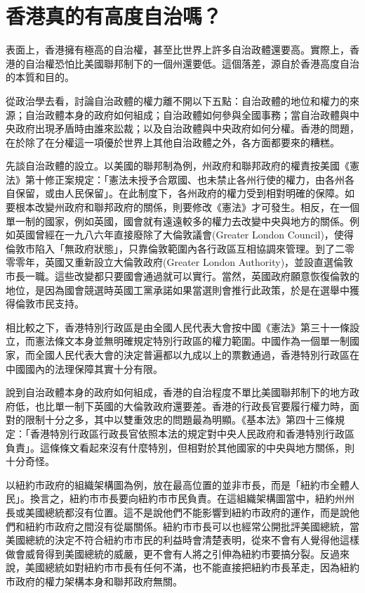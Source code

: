 \section{香港真的有高度自治嗎？}

表面上，香港擁有極高的自治權，甚至比世界上許多自治政體還要高。實際上，香港的自治權恐怕比美國聯邦制下的一個州還要低。這個落差，源自於香港高度自治的本質和目的。

從政治學去看，討論自治政體的權力離不開以下五點：自治政體的地位和權力的來源；自治政體本身的政府如何組成；自治政體如何參與全國事務；當自治政體與中央政府出現矛盾時由誰來訟裁；以及自治政體與中央政府如何分權。香港的問題，在於除了在分權這一項優於世界上其他自治政體之外，各方面都要來的糟糕。

先談自治政體的設立。以美國的聯邦制為例，州政府和聯邦政府的權責按美國《憲法》第十修正案規定：「憲法未授予合眾國、也未禁止各州行使的權力，由各州各自保留，或由人民保留」。在此制度下，各州政府的權力受到相對明確的保障。如要根本改變州政府和聯邦政府的關係，則要修改《憲法》才可發生。相反，在一個單一制的國家，例如英國，國會就有遠遠較多的權力去改變中央與地方的關係。例如英國曾經在一九八六年直接廢除了大倫敦議會(Greater London Council)，使得倫敦市陷入「無政府狀態」，只靠倫敦範圍內各行政區互相協調來管理。到了二零零零年，英國又重新設立大倫敦政府(Greater London Authority)，並設直選倫敦市長一職。這些改變都只要國會通過就可以實行。當然，英國政府願意恢復倫敦的地位，是因為國會競選時英國工黨承諾如果當選則會推行此政策，於是在選舉中獲得倫敦市民支持。

相比較之下，香港特別行政區是由全國人民代表大會按中國《憲法》第三十一條設立，而憲法條文本身並無明確規定特別行政區的權力範圍。中國作為一個單一制國家，而全國人民代表大會的決定普遍都以九成以上的票數通過，香港特別行政區在中國國內的法理保障其實十分有限。

說到自治政體本身的政府如何組成，香港的自治程度不單比美國聯邦制下的地方政府低，也比單一制下英國的大倫敦政府還要差。香港的行政長官要履行權力時，面對的限制十分之多，其中以雙重效忠的問題最為明顯。《基本法》第四十三條規定：「香港特別行政區行政長官依照本法的規定對中央人民政府和香港特別行政區負責」。這條條文看起來沒有什麼特別，但相對於其他國家的中央與地方關係，則十分奇怪。

以紐約市政府的組織架構圖為例，放在最高位置的並非市長，而是「紐約市全體人民」。換言之，紐約市市長要向紐約市市民負責。在這組織架構圖當中，紐約州州長或美國總統都沒有位置。這不是說他們不能影響到紐約市政府的運作，而是說他們和紐約市政府之間沒有從屬關係。紐約市市長可以也經常公開批評美國總統，當美國總統的決定不符合紐約市市民的利益時會清楚表明，從來不會有人覺得他這樣做會威脅得到美國總統的威嚴，更不會有人將之引伸為紐約市要搞分裂。反過來說，美國總統如對紐約市市長有任何不滿，也不能直接把紐約市長革走，因為紐約市政府的權力架構本身和聯邦政府無關。

